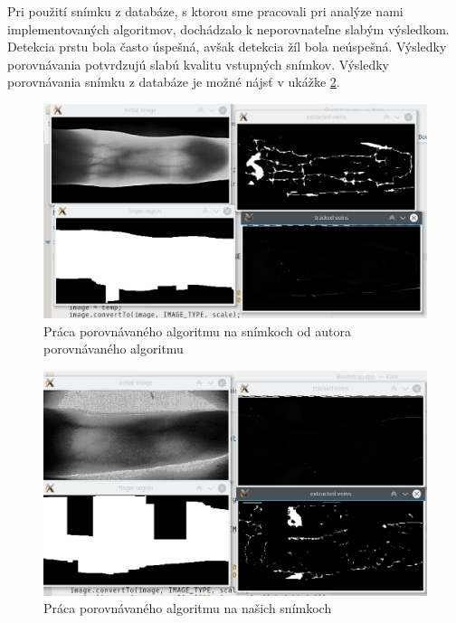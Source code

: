 \documentclass[11pt,a4paper]{article}
\begin{document}
Pri použití snímku z databáze, s ktorou sme pracovali pri analýze nami
implementovaných algoritmov, dochádzalo k neporovnateľne slabým výsledkom.
Detekcia prstu bola často úspešná, avšak detekcia žíl bola neúspešná.
Výsledky porovnávania potvrdzujú slabú kvalitu vstupných snímkov. Výsledky
porovnávania snímku z databáze je možné nájsť v ukážke \ref{fig:test_nas}.

\begin{landscape}
\begin{figure}[ht!]
	\centering
	\includegraphics[width=27cm]{fig/test_orig.eps}
	\caption{\label{fig:test_orig} Práca porovnávaného algoritmu na snímkoch od autora porovnávaného algoritmu}
\end{figure}
\end{landscape}

\begin{landscape}
\begin{figure}[ht!]
	\centering
	\includegraphics[width=27cm]{fig/test_nas.eps}
	\caption{\label{fig:test_nas} Práca porovnávaného algoritmu na našich snímkoch}
\end{figure}
\end{landscape}
\end{document}

